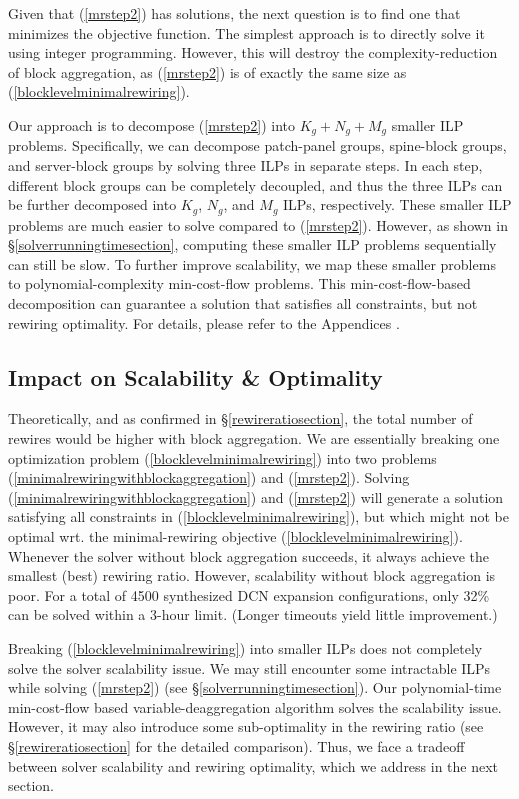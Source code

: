 \documentclass[letterpaper,twocolumn,10pt]{article}
\begin{document}
Given that (\ref{mrstep2}) has solutions, the next question is to find one that minimizes the objective function. The simplest approach is to directly solve it using integer programming. However, this will destroy the complexity-reduction of block aggregation, as (\ref{mrstep2}) is of exactly the same size as (\ref{blocklevelminimalrewiring}).

Our approach is to decompose (\ref{mrstep2}) into $K_g+N_g+M_g$ smaller ILP problems. Specifically, we can decompose patch-panel groups, spine-block groups, and server-block groups by solving three ILPs in separate steps. In each step, different block groups can be completely decoupled, and thus the three ILPs can be further decomposed into $K_g$, $N_g$, and $M_g$ ILPs, respectively. These smaller ILP problems are much easier to solve compared to (\ref{mrstep2}). However, as shown in \S\ref{solverrunningtimesection}, computing these smaller ILP problems sequentially can still be slow. To further improve scalability, we map these smaller problems to polynomial-complexity min-cost-flow problems. This min-cost-flow-based decomposition can guarantee a solution that satisfies all constraints, but not rewiring optimality. For details, please refer to {\ifpaper \cite{TechnicalReport} \else the Appendices \fi}.

\subsection{Impact on Scalability \& Optimality}

Theoretically, and as confirmed in \S\ref{rewireratiosection}, the total number of rewires would be higher with block aggregation. We are essentially breaking one optimization problem (\ref{blocklevelminimalrewiring}) into two problems (\ref{minimalrewiringwithblockaggregation}) and (\ref{mrstep2}). Solving  (\ref{minimalrewiringwithblockaggregation}) and (\ref{mrstep2}) will 
generate a solution satisfying all constraints in (\ref{blocklevelminimalrewiring}), but which might not be optimal wrt. the minimal-rewiring objective (\ref{blocklevelminimalrewiring}). Whenever the solver without block aggregation succeeds, it always achieve the smallest (best) rewiring ratio. However, scalability without block aggregation is poor. For a total of 4500 synthesized DCN expansion configurations, only 32\% can be solved within a 3-hour limit. (Longer timeouts yield little improvement.)

Breaking (\ref{blocklevelminimalrewiring}) into smaller ILPs does not completely solve the solver scalability issue. We may still encounter some intractable ILPs while solving (\ref{mrstep2}) (see \S\ref{solverrunningtimesection}).
Our polynomial-time min-cost-flow based variable-deaggregation algorithm solves the scalability issue. However, it may also introduce some sub-optimality in the rewiring ratio (see \S\ref{rewireratiosection} for the detailed comparison). Thus, we face a tradeoff between solver scalability and rewiring optimality, which we address in the next section.
\end{document}
